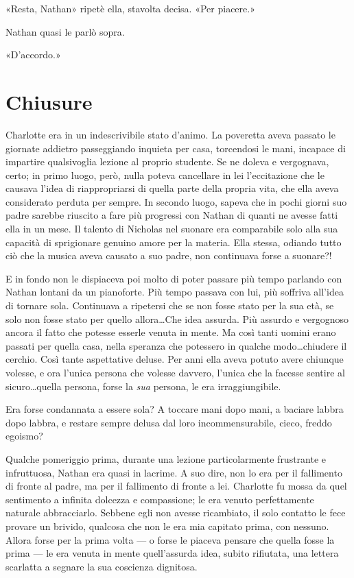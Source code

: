\documentclass[a4paper,oneside,11pt]{memoir}
\begin{document}
«Resta, Nathan» ripetè ella, stavolta decisa. «Per piacere.»

Nathan quasi le parlò sopra.

«D'accordo.»

\chapter{Chiusure}

Charlotte era in un indescrivibile stato d'animo. La poveretta aveva passato le giornate addietro
passeggiando inquieta per casa, torcendosi le mani, incapace di impartire qualsivoglia lezione al
proprio studente. Se ne doleva e vergognava, certo; in primo luogo, però, nulla poteva cancellare in
lei l'eccitazione che le causava l'idea di riappropriarsi di quella parte della propria vita, che
ella aveva considerato perduta per sempre. In secondo luogo, sapeva che in pochi giorni suo padre
sarebbe riuscito a fare più progressi con Nathan di quanti ne avesse fatti ella in un mese. Il
talento di Nicholas nel suonare era comparabile solo alla sua capacità di sprigionare genuino amore
per la materia. Ella stessa, odiando tutto ciò che la musica aveva causato a suo padre, non
continuava forse a suonare?!

E in fondo non le dispiaceva poi molto di poter passare più tempo parlando con Nathan lontani da un
pianoforte. Più tempo passava con lui, più soffriva all'idea di tornare sola. Continuava a ripetersi
che se non fosse stato per la sua età, se solo non fosse stato per quello allora\dots Che idea
assurda. Più assurdo e vergognoso ancora il fatto che potesse esserle venuta in mente. Ma così tanti
uomini erano passati per quella casa, nella speranza che potessero in qualche modo\dots chiudere il
cerchio. Così tante aspettative deluse. Per anni ella aveva potuto avere chiunque volesse, e ora
l'unica persona che volesse davvero, l'unica che la facesse sentire al sicuro\dots quella persona,
forse la \emph{sua} persona, le era irraggiungibile.

Era forse condannata a essere sola? A toccare mani dopo mani, a baciare labbra dopo labbra, e
restare sempre delusa dal loro incommensurabile, cieco, freddo egoismo?

Qualche pomeriggio prima, durante una lezione particolarmente frustrante e infruttuosa, Nathan era
quasi in lacrime. A suo dire, non lo era per il fallimento di fronte al padre, ma per il fallimento
di fronte a lei. Charlotte fu mossa da quel sentimento a infinita dolcezza e compassione; le era
venuto perfettamente naturale abbracciarlo. Sebbene egli non avesse ricambiato, il solo contatto le
fece provare un brivido, qualcosa che non le era mia capitato prima, con nessuno. Allora forse per
la prima volta — o forse le piaceva pensare che quella fosse la prima — le era venuta in mente
quell'assurda idea, subito rifiutata, una lettera scarlatta a segnare la sua coscienza dignitosa.
\end{document}
